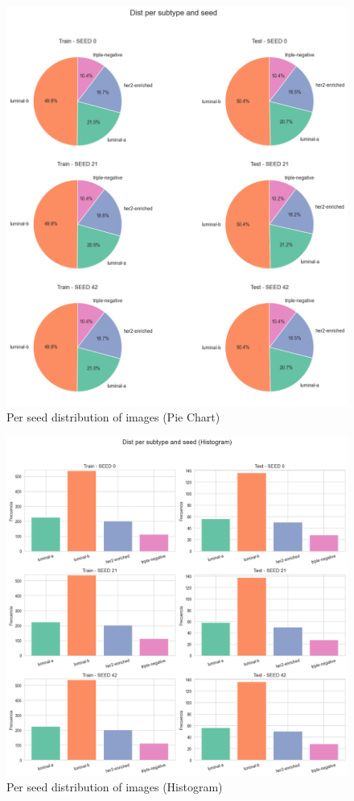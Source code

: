 \documentclass[a4paper,10pt]{book}
\begin{document}
\begin{figure}[h!]
	\centering
	\includegraphics[width=1.0\linewidth]{reports//assets/pie_dist.png}
	\caption[Per seed distribution (Pie)]{Per seed distribution of images (Pie Chart) }
	\label{fig:pie_dist}
\end{figure}


\begin{figure}[h!]
	\centering
	\includegraphics[width=1.0\linewidth]{reports//assets/hist_dist.png}
	\caption[Per seed distribution (Histogram)]{Per seed distribution of images (Histogram) }
	\label{fig:pie_hist}
\end{figure}
\end{document}
